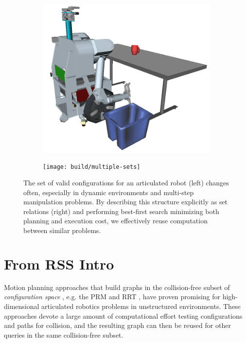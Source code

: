 \begin{figure}
\centering
\begin{subfigure}[b]{.45\linewidth}
\includegraphics[width=\columnwidth]{figs/simple-table-clearing-task.png}
\end{subfigure}%
\quad%
\begin{subfigure}[b]{.45\linewidth}
\texttt{[image: build/multiple-sets]}
\end{subfigure}
\caption{
  The set of valid configurations for an articulated robot (left)
  changes often,
  especially in dynamic environments
  and multi-step manipulation problems.
  By describing this structure explicitly as set relations (right)
  and performing best-first search
  minimizing both planning and execution cost,
  we effectively reuse computation between similar
  problems.}
\label{fig:manip-example}
\end{figure}

\section{From RSS Intro}

Motion planning approaches that build graphs
in the collision-free subset of
\emph{configuration space} \cite{lozanoperez1983cspace},
e.g. the
PRM \cite{kavrakietal1996prm}
and RRT \cite{lavallekuffner1999rrt},
have proven promising
for high-dimensional articulated robotics problems
in unstructured environments.
These approaches devote a large amount of computational effort
testing configurations and paths for collision,
and the resulting graph can then be reused
for other queries in the same collision-free subset.

